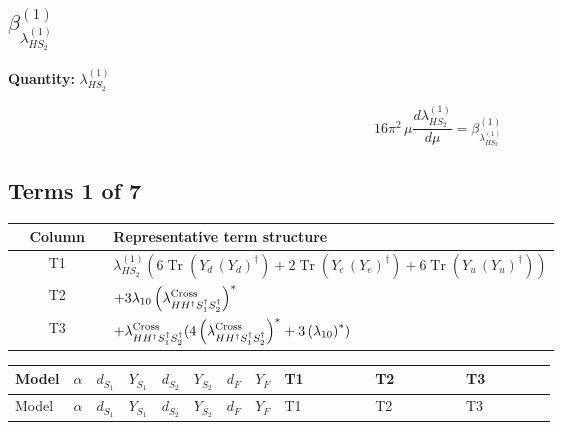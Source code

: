 \documentclass[8pt]{article}
\begin{document}
\begin{landscape}
\section*{$\beta_{\lambda_{HS_2}^{(1)}}^{(1)}$}
\noindent\textbf{Quantity: }$\lambda_{HS_2}^{(1)}$\par\smallskip
\[16\pi^2\,\mu\frac{d \lambda_{HS_2}^{(1)}}{d\mu}=\beta_{\lambda_{HS_2}^{(1)}}^{(1)}\]
\subsection*{Terms 1 of 7}
\begin{center}
\begin{tabular}{@{}c >{\raggedright\arraybackslash}p{0.82\linewidth}@{}}
\toprule
Column & Representative term structure \\
\midrule
T1 & \(\displaystyle {\lambda_{HS_2}^{(1)}} (6 \operatorname{Tr}\!\left({Y_d}\,\left({Y_d}\right)^{\dagger}\right)+2 \operatorname{Tr}\!\left({Y_e}\,\left({Y_e}\right)^{\dagger}\right)+6 \operatorname{Tr}\!\left({Y_u}\,\left({Y_u}\right)^{\dagger}\right))\) \\
\midrule
T2 & \(\displaystyle +3 {\lambda_{10}} \left({\lambda_{H H^\dagger S_1^\dagger S_2^\dagger}^{\rm Cross}}\right)^{*}\) \\
\midrule
T3 & \(\displaystyle +{\lambda_{H H^\dagger S_1^\dagger S_2^\dagger}^{\rm Cross}} (4 \left({\lambda_{H H^\dagger S_1^\dagger S_2^\dagger}^{\rm Cross}}\right)^{*}+3 \left({\lambda_{10}}\right)^{*})\) \\
\midrule
\bottomrule
\end{tabular}
\end{center}
\smallskip
\tiny
\begin{longtable}{@{}llcccccc >{\raggedright\arraybackslash}p{0.21\linewidth} >{\raggedright\arraybackslash}p{0.21\linewidth} >{\raggedright\arraybackslash}p{0.21\linewidth}@{}}
\toprule
Model & $\alpha$ & $d_{S_1}$ & $Y_{S_1}$ & $d_{S_2}$ & $Y_{S_2}$ & $d_F$ & $Y_F$ & T1 & T2 & T3 \\
\midrule
\endfirsthead
\toprule
Model & $\alpha$ & $d_{S_1}$ & $Y_{S_1}$ & $d_{S_2}$ & $Y_{S_2}$ & $d_F$ & $Y_F$ & T1 & T2 & T3 \\
\midrule
\endhead

\end{longtable}
\end{landscape}
\end{document}
